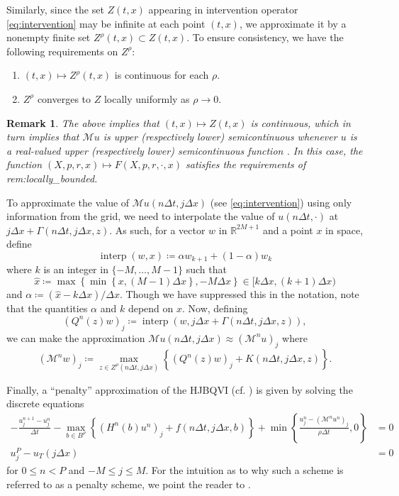 \documentclass[12pt]{article}
\newcounter{dummy}
\newtheorem{rem}[dummy]{Remark}
\begin{document}
Similarly, since the set $Z(t,x)$ appearing in intervention operator
\eqref{eq:intervention} may be infinite at each point $(t,x)$, we
approximate it by a nonempty finite set $Z^{\rho}(t,x)\subset Z(t,x)$.
To ensure consistency, we have the following requirements on $Z^{\rho}$:
\begin{enumerate}[label=(H\arabic*),start=7]
\item $(t,x)\mapsto Z^{\rho}(t,x)$ is continuous for each $\rho$.
\item \label{enu:comparison_end}$Z^{\rho}$ converges to $Z$ locally uniformly
as $\rho\rightarrow0$.
\end{enumerate}
\begin{rem}\label{rem:Z_is_continuous}The above implies that $(t,x)\mapsto Z(t,x)$
is continuous, which in turn implies that $\mathcal{M}u$
is upper (respectively lower) semicontinuous whenever $u$ is a real-valued
upper (respectively lower) semicontinuous function \cite[Lemma 4.3]{MR2568293}.
In this case, the function $(X,p,r,x)\mapsto F(X,p,r,\cdot,x)$ satisfies
the requirements of {\prettyref}{rem:locally_bounded}.\end{rem}

To approximate the value of $\mathcal{M}u(n\Delta t,j\Delta x)$ (see
\eqref{eq:intervention}) using only information from the grid, we
need to interpolate the value of $u(n\Delta t,\cdot)$ at $j\Delta x+\Gamma(n\Delta t,j\Delta x,z)$.
As such, for a vector $w$ in $\mathbb{R}^{2M+1}$ and a point $x$
in space, define
\[
{\operatorname{interp}}(w,x)\coloneqq\alpha w_{k+1}+(1-\alpha)w_{k}
\]
where $k$ is an integer in $\{-M,\ldots,M-1\}$ such that 
\[
\hat{x}\coloneqq\max\left\{ \min\left\{ x,\left(M-1\right)\Delta x\right\} ,-M\Delta x\right\} \in[k\Delta x,(k+1)\Delta x)
\]
and $\alpha\coloneqq(\hat{x}-k\Delta x)/\Delta x$. Though we have
suppressed this in the notation, note that the quantities $\alpha$
and $k$ depend on $x$. Now, defining
\[
(Q^{n}(z)w)_{j}\coloneqq{\operatorname{interp}}(w,j\Delta x+\Gamma(n\Delta t,j\Delta x,z)),
\]
we can make the approximation $\mathcal{M}u(n\Delta t,j\Delta x)\approx(\mathcal{M}^{n}u)_{j}$
where
\[
(\mathcal{M}^{n}w)_{j}\coloneqq\max_{z\in Z^{\rho}(n\Delta t,j\Delta x)}\left\{ (Q^{n}(z)w)_{j}+K(n\Delta t,j\Delta x,z)\right\} .
\]

Finally, a ``penalty'' approximation of the HJBQVI (cf. \cite{altarovici2016optimal})
is given by solving the discrete equations
\begin{align}
-\frac{u_{j}^{n+1}-u_{j}^{n}}{\Delta t}-\max_{b\in B^{\rho}}\left\{ (H^{n}(b)u^{n})_{j}+f(n\Delta t,j\Delta x,b)\right\} +\min\left\{ \frac{u_{j}^{n}-(\mathcal{M}^{n}u^{n})_{j}}{\rho\Delta t},0\right\}  & =0\nonumber \\
u_{j}^{P}-u_{T}(j\Delta x) & =0\label{eq:penalty_scheme}
\end{align}
for $0{\leqslant} n<P$ and $-M{\leqslant} j{\leqslant} M$. For the intuition as to why
such a scheme is referred to as a penalty scheme, we point the reader
to \cite{MR673169}.
\end{document}
